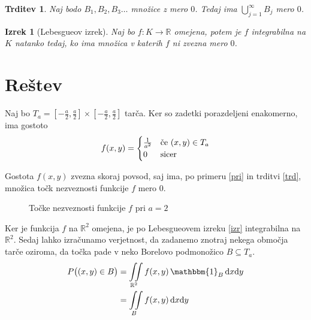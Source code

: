 \documentclass{amsart}
\newcommand{\R}{\mathbb{R}}
\theoremstyle{definition} %
\theoremstyle{plain} %
\newtheorem{izrek}[definicija]{Izrek}
\newtheorem{trditev}[definicija]{Trditev}
\newtheorem{posledica}[definicija]{Posledica}
\begin{document}
\begin{trditev}\label{trd}
    Naj bodo $B_1, B_2, B_3 \ldots $ množice z mero $0$. Tedaj ima $\bigcup_{j=1}^{\infty} B_{j}$ mero $0$.
\end{trditev}


\begin{izrek}[Lebesgueov izrek]\label{izr}
    Naj bo $f \colon K \to \R $ omejena, potem je $f$ integrabilna na $K$ natanko tedaj, ko ima množica
    v katerih $f$ ni zvezna mero $0$.
\end{izrek}

\pagebreak

\section{Reštev}

Naj bo $T_a = \left[ -\frac{a}{2} , \frac{a}{2}\right]\times\left[-\frac{a}{2},\frac{a}{2}\right]$
tarča. Ker so zadetki porazdeljeni enakomerno, ima gostoto
\begin{equation*}
    f(x,y) = 
    \begin{cases}
        \frac{1}{a^2} & \text{če $ (x,y) \in T_a  $} \\
        0 & \text{sicer}
    \end{cases}
\end{equation*}

Gostota $f(x,y)$ zvezna skoraj povsod, saj ima, po primeru \eqref{pri} in trditvi 
\eqref{trd}, množica točk nezveznosti funkcije $f$ mero $0$.
\begin{figure}[!ht]
    \centering
    \caption{Točke nezveznosti funkcije $f$ pri $a=2$}
\end{figure}

Ker je funkcija $f$ na $\R^2$ omejena, je po Lebesgueovem izreku \eqref{izr} integrabilna na $\R^2$.
Sedaj lahko izračunamo verjetnost, da zadanemo znotraj nekega območja tarče oziroma, da točka
pade v neko Borelovo podmonožico $B \subseteq T_a$.
\begin{align*}
    P\big((x,y) \in B\big)
    &= \iint\limits_{\R^2} f(x,y) \, \mathbbm{1}_{B} \, \mathrm{d}x\mathrm{d}y \\
    &= \iint\limits_{B} f(x,y) \, \mathrm{d}x\mathrm{d}y
\end{align*}
\end{document}
